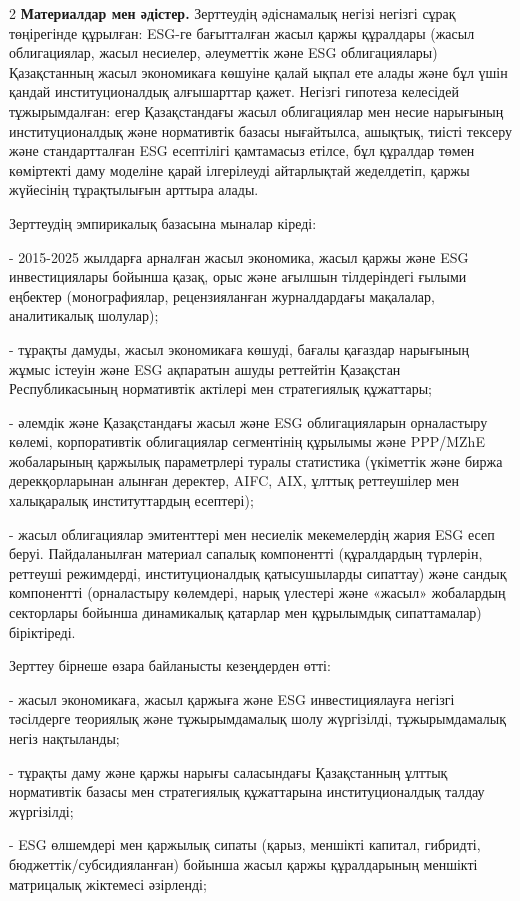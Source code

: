 \begin{multicols}{2}
{\bfseries Материалдар мен әдістер.} Зерттеудің әдіснамалық негізі негізгі
сұрақ төңірегінде құрылған: ESG-ге бағытталған жасыл қаржы құралдары
(жасыл облигациялар, жасыл несиелер, әлеуметтік және ESG облигациялары)
Қазақстанның жасыл экономикаға көшуіне қалай ықпал ете алады және бұл
үшін қандай институционалдық алғышарттар қажет. Негізгі гипотеза
келесідей тұжырымдалған: егер Қазақстандағы жасыл облигациялар мен несие
нарығының институционалдық және нормативтік базасы нығайтылса, ашықтық,
тиісті тексеру және стандартталған ESG есептілігі қамтамасыз етілсе, бұл
құралдар төмен көміртекті даму моделіне қарай ілгерілеуді айтарлықтай
жеделдетіп, қаржы жүйесінің тұрақтылығын арттыра алады.

Зерттеудің эмпирикалық базасына мыналар кіреді:

- 2015-2025 жылдарға арналған жасыл экономика, жасыл қаржы және ESG
инвестициялары бойынша қазақ, орыс және ағылшын тілдеріндегі ғылыми
еңбектер (монографиялар, рецензияланған журналдардағы мақалалар,
аналитикалық шолулар);

- тұрақты дамуды, жасыл экономикаға көшуді, бағалы қағаздар нарығының
жұмыс істеуін және ESG ақпаратын ашуды реттейтін Қазақстан
Республикасының нормативтік актілері мен стратегиялық құжаттары;

- әлемдік және Қазақстандағы жасыл және ESG облигацияларын орналастыру
көлемі, корпоративтік облигациялар сегментінің құрылымы және PPP/MZhE
жобаларының қаржылық параметрлері туралы статистика (үкіметтік және
биржа дерекқорларынан алынған деректер, AIFC, AIX, ұлттық реттеушілер
мен халықаралық институттардың есептері);

- жасыл облигациялар эмитенттері мен несиелік мекемелердің жария ESG
есеп беруі. Пайдаланылған материал сапалық компонентті (құралдардың
түрлерін, реттеуші режимдерді, институционалдық қатысушыларды сипаттау)
және сандық компонентті (орналастыру көлемдері, нарық үлестері және
«жасыл» жобалардың секторлары бойынша динамикалық қатарлар мен
құрылымдық сипаттамалар) біріктіреді.

Зерттеу бірнеше өзара байланысты кезеңдерден өтті:

- жасыл экономикаға, жасыл қаржыға және ESG инвестициялауға негізгі
тәсілдерге теориялық және тұжырымдамалық шолу жүргізілді, тұжырымдамалық
негіз нақтыланды;

- тұрақты даму және қаржы нарығы саласындағы Қазақстанның ұлттық
нормативтік базасы мен стратегиялық құжаттарына институционалдық талдау
жүргізілді;

- ESG өлшемдері мен қаржылық сипаты (қарыз, меншікті капитал, гибридті,
бюджеттік/субсидияланған) бойынша жасыл қаржы құралдарының меншікті
матрицалық жіктемесі әзірленді;


\end{multicols}
